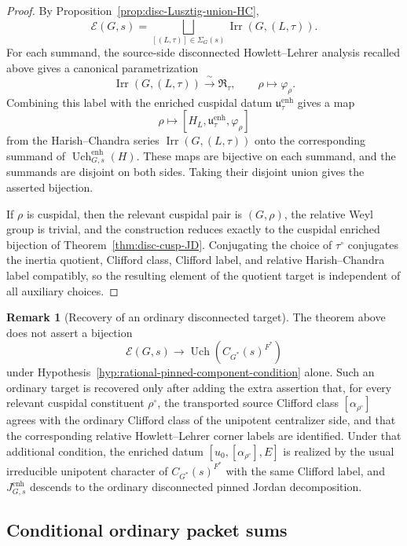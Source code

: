 \documentclass{amsart}
\theoremstyle{plain}
\numberwithin{equation}{section}
\theoremstyle{definition}
\newtheorem{remark}[theorem]{Remark}
\newcommand{\cE}{\mathcal{E}}
\newcommand{\Irr}{\operatorname{Irr}}
\newcommand{\Uch}{\operatorname{Uch}}
\begin{document}
\begin{proof}
By Proposition~\ref{prop:disc-Lusztig-union-HC},
\[
        \cE(G,s)
        =
        \bigsqcup_{[(L,\tau)]\in\Sigma_G(s)}
        \Irr(G,(L,\tau)).
\]
For each summand, the source-side disconnected Howlett--Lehrer analysis recalled
above gives a canonical parametrization
\[
        \Irr(G,(L,\tau))
        \xrightarrow{\ \sim\ }
        \mathfrak R_\tau,
        \qquad
        \rho\longmapsto\varphi_\rho .
\]
Combining this label with the enriched cuspidal datum
\(\mathfrak u^{\mathrm{enh}}_\tau\) gives a map
\[
        \rho
        \longmapsto
        [H_L,\mathfrak u^{\mathrm{enh}}_\tau,\varphi_\rho]
\]
from the Harish--Chandra series \(\Irr(G,(L,\tau))\) onto the corresponding
summand of \(\Uch^{\mathrm{enh}}_{G,s}(H)\).  These maps are bijective on each
summand, and the summands are disjoint on both sides.  Taking their disjoint
union gives the asserted bijection.

If \(\rho\) is cuspidal, then the relevant cuspidal pair is \((G,\rho)\), the
relative Weyl group is trivial, and the construction reduces exactly to the
cuspidal enriched bijection of Theorem~\ref{thm:disc-cusp-JD}.  Conjugating the
choice of \(\tau^\circ\) conjugates the inertia quotient, Clifford class,
Clifford label, and relative Harish--Chandra label compatibly, so the resulting
element of the quotient target is independent of all auxiliary choices.
\end{proof}

\begin{remark}[Recovery of an ordinary disconnected target]
\label{rmk:ordinary-disc-JD-recovery}
The theorem above does not assert a bijection
\[
        \cE(G,s)\longrightarrow \Uch(C_{G^*}(s)^{F^*})
\]
under Hypothesis~\ref{hyp:rational-pinned-component-condition} alone.  Such an
ordinary target is recovered only after adding the extra assertion that, for
every relevant cuspidal constituent \(\rho^\circ\), the transported source
Clifford class \([\alpha_{\rho^\circ}]\) agrees with the ordinary Clifford class
of the unipotent centralizer side, and that the corresponding relative
Howlett--Lehrer corner labels are identified.  Under that additional condition,
the enriched datum \([u_0,[\alpha_{\rho^\circ}],E]\) is realized by the usual
irreducible unipotent character of \(C_{G^*}(s)^{F^*}\) with the same Clifford
label, and \(J^{\mathrm{enh}}_{G,s}\) descends to the ordinary disconnected
pinned Jordan decomposition.
\end{remark}

\subsection{Conditional ordinary packet sums}
\label{subsec:conditional-ordinary-packet-sums}
\end{document}
